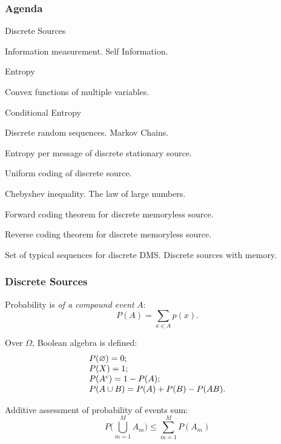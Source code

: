 \documentclass[14pt]{beamer}
\begin{document}
\begin{frame}
\frametitle{Agenda}
\begin{enumerate}
\footnotesize {

\item Discrete Sources
\item Information measurement. Self Information.
\item Entropy
\item Convex functions of multiple variables.
\item Conditional Entropy
\item Discrete random sequences. Markov Chains.
\item Entropy per message of discrete stationary source.
\item Uniform coding of discrete source.
\item Chebyshev inequality. The law of large numbers.
\item Forward coding theorem for discrete memoryless source.
\item Reverse coding theorem for discrete memoryless source.
\item Set of typical sequences for discrete DMS. Discrete sources with memory.
}
\end{enumerate}
\end{frame}

\begin{frame}
\frametitle{Discrete Sources}
\begin{itemize}
\small{

    \item Probability is \textit{of a compound event} $A$:
    \[
    P(A) = \sum\limits_{x \in A} {p(x)} .
    \]
    
    \item Over $\Omega$, Boolean algebra is defined:
    \[
    \begin{tabular}{l}
    $ P(\varnothing) = 0; $ \\
    $ P(X) = 1;         $ \\
    $ P(A^c) = 1 - P(A);$\\
    $ P(A \cup B) = P(A) + P(B) - P(AB).$
    \end{tabular}
    \]

    \item Additive assessment of probability of events sum:
    \[
    P(\bigcup\limits_{m = 1}^M {A_m ) \le \sum\limits_{m = 1}^M {P(A_m )} }
    \]
}
\end{itemize}
\end{frame}
\end{document}
